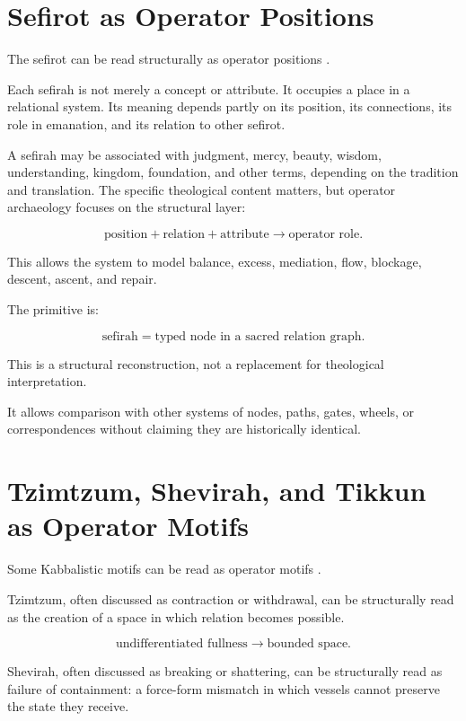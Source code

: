 \documentclass[11pt]{book}
\begin{document}
\section{Sefirot as Operator Positions}

The sefirot can be read structurally as operator positions \cite{Scholem1974Kabbalah,Idel1988KabbalahNewPerspectives}.

Each sefirah is not merely a concept or attribute. It occupies a place in a relational system. Its meaning depends partly on its position, its connections, its role in emanation, and its relation to other sefirot.

A sefirah may be associated with judgment, mercy, beauty, wisdom, understanding, kingdom, foundation, and other terms, depending on the tradition and translation. The specific theological content matters, but operator archaeology focuses on the structural layer:

\[
\text{position} + \text{relation} + \text{attribute} \rightarrow \text{operator role}.
\]

This allows the system to model balance, excess, mediation, flow, blockage, descent, ascent, and repair.

The primitive is:

\[
\text{sefirah} = \text{typed node in a sacred relation graph}.
\]

This is a structural reconstruction, not a replacement for theological interpretation.

It allows comparison with other systems of nodes, paths, gates, wheels, or correspondences without claiming they are historically identical.

\section{Tzimtzum, Shevirah, and Tikkun as Operator Motifs}

Some Kabbalistic motifs can be read as operator motifs \cite{Scholem1974Kabbalah,Idel1988KabbalahNewPerspectives}.

Tzimtzum, often discussed as contraction or withdrawal, can be structurally read as the creation of a space in which relation becomes possible.

\[
\text{undifferentiated fullness}
\rightarrow
\text{bounded space}.
\]

Shevirah, often discussed as breaking or shattering, can be structurally read as failure of containment: a force-form mismatch in which vessels cannot preserve the state they receive.
\end{document}
